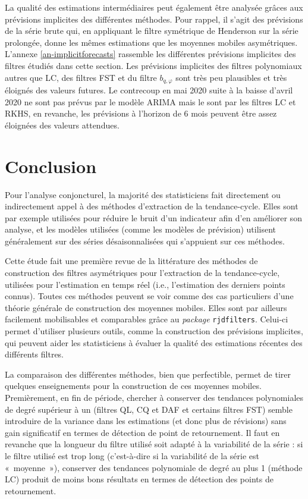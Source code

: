 \documentclass[
  12pt,
  french,
  12pt,a4paper]{article}
\newcommand\1{\mathds{1}}
\begin{document}
La qualité des estimations intermédiaires peut également être analysée grâces aux prévisions implicites des différentes méthodes. Pour rappel, il s'agit des prévisions de la série brute qui, en appliquant le filtre symétrique de Henderson sur la série prolongée, donne les mêmes estimations que les moyennes mobiles asymétriques. L'annexe \ref{an-implicitforecasts} rassemble les différentes prévisions implicites des filtres étudiés dans cette section.
Les prévisions implicites des filtres polynomiaux autres que LC, des filtres FST et du filtre \(b_{q,\varphi}\) sont très peu plausibles et très éloignés des valeurs futures.
Le contrecoup en mai 2020 suite à la baisse d'avril 2020 ne sont pas prévus par le modèle ARIMA mais le sont par les filtres LC et RKHS, en revanche, les prévisions à l'horizon de 6 mois peuvent être assez éloignées des valeurs attendues.

\newpage

\hypertarget{conclusion}{%
\section*{Conclusion}\label{conclusion}}

Pour l'analyse conjoncturel, la majorité des statisticiens fait directement ou indirectement appel à des méthodes d'extraction de la tendance-cycle.
Elles sont par exemple utilisées pour réduire le bruit d'un indicateur afin d'en améliorer son analyse, et les modèles utilisées (comme les modèles de prévision) utilisent généralement sur des séries désaisonnalisées qui s'appuient sur ces méthodes.

Cette étude fait une première revue de la littérature des méthodes de construction des filtres asymétriques pour l'extraction de la tendance-cycle, utilisées pour l'estimation en temps réel (i.e., l'estimation des derniers points connus).
Toutes ces méthodes peuvent se voir comme des cas particuliers d'une théorie générale de construction des moyennes mobiles.
Elles sont par ailleurs facilement mobilisables et comparables grâce au \emph{package}  \texttt{rjdfilters}.
Celui-ci permet d'utiliser plusieurs outils, comme la construction des prévisions implicites, qui peuvent aider les statisticiens à évaluer la qualité des estimations récentes des différents filtres.

La comparaison des différentes méthodes, bien que perfectible, permet de tirer quelques enseignements pour la construction de ces moyennes mobiles.
Premièrement, en fin de période, chercher à conserver des tendances polynomiales de degré supérieur à un (filtres QL, CQ et DAF et certains filtres FST) semble introduire de la variance dans les estimations (et donc plus de révisions) sans gain significatif en termes de détection de point de retournement.
Il faut en revanche que la longueur du filtre utilisé soit adapté à la variabilité de la série : si le filtre utilisé est trop long (c'est-à-dire si la variabilité de la série est «~moyenne~»), conserver des tendances polynomiale de degré au plus 1 (méthode LC) produit de moins bons résultats en termes de détection des points de retournement.
\end{document}
